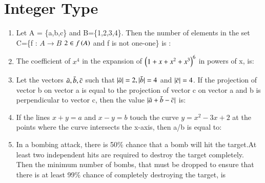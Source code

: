 \documentclass[journal,,12pt,onecolumn]{IEEEtran}
\theoremstyle{remark}
\begin{document}
\section*{Integer Type}
\begin{enumerate}
 \item Let A = \{a,b,c\} and B=\{1,2,3,4\}. Then the number of elements in the set C=\{f : $A \rightarrow B$ $2 \in f\left(A\right)$ and f is not one-one\} is :
 \item The coefficient of $x^4$ in the expansion of $\left(1+x+x^2+x^3\right)^6$ in powers of x, is:
 \item Let the vectors $\Bar{a},\Bar{b},\Bar{c}$ such that $|\Bar{a}|=2,|\Bar{b}|=4$ and $|\Bar{c}|=4$. If the projection of vector b on vector a is equal to the projection of vector c on vector a and b is perpendicular to vector c, then the value $|\Bar{a}+\Bar{b}-\Bar{c}|$ is:
 \item If the lines $x+y=a$ and $x-y=b$ touch the curve $y=x^2-3x+2$ at the points where the curve intersects the x-axis, then a/b is equal to:
 \item In a bombing attack, there is 50\% chance that a bomb will hit the target.At least two independent hits are required to destroy the target completely. Then the minimum number of bombs, that must be dropped to ensure that there is at least 99\% chance of completely destroying the target, is
 \end{enumerate}
 
\end{document}
